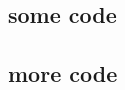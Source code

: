 \newpage
\begin{appendices}
\section{some code}


\newpage
\subsection{more code}







\end{appendices}
